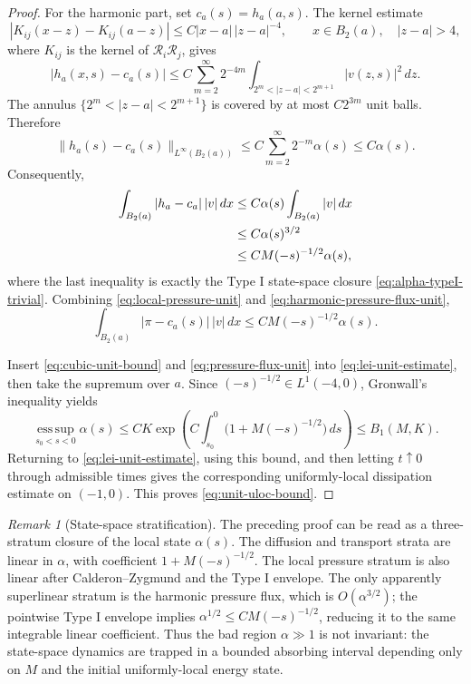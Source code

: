 \documentclass[11pt]{amsart}
\theoremstyle{plain}
\theoremstyle{definition}
\theoremstyle{remark}
\newtheorem{remark}[remark]{Remark}
\begin{document}
\begin{proof}
For the harmonic part, set \(c_a(s)=h_a(a,s)\).  The kernel estimate
\[
  |K_{ij}(x-z)-K_{ij}(a-z)|
  \le C |x-a|\,|z-a|^{-4},
  \qquad x\in B_2(a),\quad |z-a|>4,
\]
where \(K_{ij}\) is the kernel of \(\mathcal R_i\mathcal R_j\), gives
\[
  |h_a(x,s)-c_a(s)|
  \le
  C\sum_{m=2}^{\infty}2^{-4m}
    \int_{2^m<|z-a|<2^{m+1}} |v(z,s)|^2\,dz .
\]
The annulus \(\{2^m<|z-a|<2^{m+1}\}\) is covered by at most \(C2^{3m}\)
unit balls.  Therefore
\begin{equation}\label{eq:harmonic-pressure-unit}
  \|h_a(s)-c_a(s)\|_{L^\infty(B_2(a))}
  \le C\sum_{m=2}^{\infty}2^{-m}\alpha(s)
  \le C\alpha(s).
\end{equation}
Consequently,
\begin{align}
  \int_{B_2(a)} |h_a-c_a|\,|v|\,dx
  &\le C\alpha(s)\int_{B_2(a)} |v|\,dx                    \notag\\
  &\le C\alpha(s)^{3/2}                                    \notag\\
  &\le C M(-s)^{-1/2}\alpha(s),
\label{eq:harmonic-pressure-flux-unit}
\end{align}
where the last inequality is exactly the Type I state-space closure
\eqref{eq:alpha-typeI-trivial}.
Combining \eqref{eq:local-pressure-unit} and
\eqref{eq:harmonic-pressure-flux-unit},
\begin{equation}\label{eq:pressure-flux-unit}
  \int_{B_2(a)} |\pi-c_a(s)|\,|v|\,dx
  \le C M(-s)^{-1/2}\alpha(s).
\end{equation}

Insert \eqref{eq:cubic-unit-bound} and \eqref{eq:pressure-flux-unit} into
\eqref{eq:lei-unit-estimate}, then take the supremum over \(a\).  Since
\((-s)^{-1/2}\in L^1(-4,0)\), Gronwall's inequality yields
\[
  \operatorname*{ess\,sup}_{s_0<s<0}\alpha(s)
  \le C K
     \exp\left(C\int_{s_0}^{0}\bigl(1+M(-s)^{-1/2}\bigr)\,ds\right)
  \le B_1(M,K).
\]
Returning to \eqref{eq:lei-unit-estimate}, using this bound, and then letting
\(t\uparrow0\) through admissible times gives the corresponding
uniformly-local dissipation estimate on \((-1,0)\).  This proves
\eqref{eq:unit-uloc-bound}.
\end{proof}

\begin{remark}[State-space stratification]
\label{rem:state-space-stratification}
The preceding proof can be read as a three-stratum closure of the local state
\(\alpha(s)\).  The diffusion and transport strata are linear in
\(\alpha\), with coefficient \(1+M(-s)^{-1/2}\).  The local pressure stratum is
also linear after Calderon--Zygmund and the Type I envelope.  The only
apparently superlinear stratum is the harmonic pressure flux, which is
\(O(\alpha^{3/2})\); the pointwise Type I envelope implies
\(\alpha^{1/2}\le C M(-s)^{-1/2}\), reducing it to the same integrable linear
coefficient.  Thus the bad region \(\alpha\gg1\) is not invariant: the
state-space dynamics are trapped in a bounded absorbing interval depending
only on \(M\) and the initial uniformly-local energy state.
\end{remark}
\end{document}
